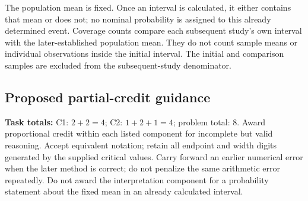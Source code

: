 The population mean is fixed. Once an interval is calculated, it either contains that mean or does not; no nominal probability is assigned to this already determined event. Coverage counts compare each subsequent study's own interval with the later-established population mean. They do not count sample means or individual observations inside the initial interval. The initial and comparison samples are excluded from the subsequent-study denominator.

\secInicio[][sec:p1]

\clearpage

\subsection*{Proposed partial-credit guidance}
\textbf{Task totals:} C1: $2+2=4$; C2: $1+2+1=4$; problem total: 8. Award proportional credit within each listed component for incomplete but valid reasoning. Accept equivalent notation; retain all endpoint and width digits generated by the supplied critical values. Carry forward an earlier numerical error when the later method is correct; do not penalize the same arithmetic error repeatedly. Do not award the interpretation component for a probability statement about the fixed mean in an already calculated interval.


\secInicio[][sec:p1]

